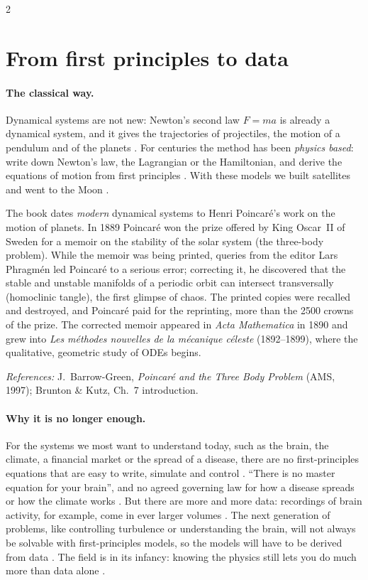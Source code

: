 \begin{paracol}{2}
\section{From first principles to data}\label{sec:ov-data}

\paragraph{The classical way.} Dynamical systems are not new: Newton's second law $F=ma$ is already a
dynamical system, and it gives the trajectories of projectiles, the motion of a pendulum and of the
planets . For centuries the method has been \emph{physics based}: write down Newton's
law, the Lagrangian or the Hamiltonian, and derive the equations of motion from first principles
. With these models we built satellites and went to the Moon
.

\begin{history}
The book dates \emph{modern} dynamical systems to Henri Poincar\'e's work on the motion of planets.
In 1889 Poincar\'e won the prize offered by King Oscar~II of Sweden for a memoir on the stability of
the solar system (the three-body problem). While the memoir was being printed, queries from the editor
Lars Phragm\'en led Poincar\'e to a serious error; correcting it, he discovered that the stable and unstable manifolds of a periodic
orbit can intersect transversally (homoclinic tangle), the first glimpse of chaos. The printed copies
were recalled and destroyed, and Poincar\'e paid for the reprinting, more than the 2500 crowns of the
prize. The corrected memoir appeared in \emph{Acta Mathematica} in 1890 and grew into \emph{Les
m\'ethodes nouvelles de la m\'ecanique c\'eleste} (1892--1899), where the qualitative, geometric
study of ODEs begins.\par
\textit{References:} J.~Barrow-Green, \emph{Poincar\'e and the Three Body Problem} (AMS, 1997);
Brunton \& Kutz, Ch.~7 introduction.
\end{history}

\paragraph{Why it is no longer enough.} For the systems we most want to understand today, such as the
brain, the climate, a financial market or the spread of a disease, there are no first-principles
equations that are easy to write, simulate and control . ``There is no master equation
for your brain'', and no agreed governing law for how a disease spreads or how the climate works
. But there are more and more data: recordings of brain activity,
for example, come in ever larger volumes . The next generation of problems, like
controlling turbulence or understanding the brain, will not always be solvable with first-principles
models, so the models will have to be derived from data . The field is in its infancy:
knowing the physics still lets you do much more than data alone .


\end{paracol}
